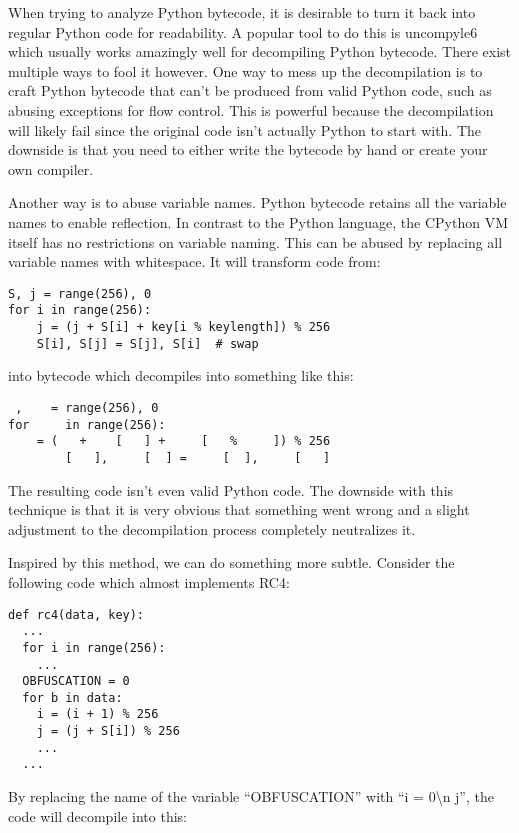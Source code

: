 \documentclass[twocolumn]{article}
\begin{document}
\vspace*{-0.3\baselineskip}


When trying to analyze Python bytecode, it is desirable to turn it back into regular Python code for readability. A popular tool to do this is uncompyle6 which usually works amazingly well for decompiling Python bytecode. There exist multiple ways to fool it however. One way to mess up the decompilation is to craft Python bytecode that can't be produced from valid Python code, such as abusing exceptions for flow control. This is powerful because the decompilation will likely fail since the original code isn't actually Python to start with. The downside is that you need to either write the bytecode by hand or create your own compiler.

Another way is to abuse variable names. Python bytecode retains all the variable names to enable reflection. In contrast to the Python language, the CPython VM itself has no restrictions on variable naming. This can be abused by replacing all variable names with whitespace. It will transform code from:

\begin{verbatim}
S, j = range(256), 0
for i in range(256):
    j = (j + S[i] + key[i % keylength]) % 256
    S[i], S[j] = S[j], S[i]  # swap
\end{verbatim}

into bytecode which decompiles into something like this:

\begin{verbatim}
 ,    = range(256), 0
for     in range(256):
    = (   +    [   ] +     [   %     ]) % 256
        [   ],     [  ] =     [  ],     [   ]
\end{verbatim}

The resulting code isn't even valid Python code. The downside with this technique is that it is very obvious that something went wrong and a slight adjustment to the decompilation process completely neutralizes it. 

Inspired by this method, we can do something more subtle. Consider the following code which almost implements RC4:

\begin{verbatim}
def rc4(data, key):
  ...
  for i in range(256):
    ...
  OBFUSCATION = 0
  for b in data:
    i = (i + 1) % 256
    j = (j + S[i]) % 256
    ...
  ...
\end{verbatim}

By replacing the name of the variable ``OBFUSCATION'' with ``i = 0\textbackslash n  j'', the code will decompile into this:
\end{document}
